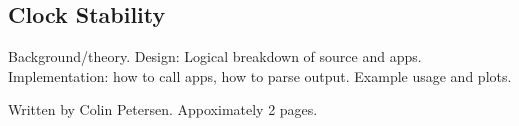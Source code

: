 \subsection*{Clock Stability}

Background/theory. Design: Logical breakdown of source and apps. Implementation: how to call apps, how to parse output. Example usage and plots.

Written by Colin Petersen. Appoximately 2 pages.
